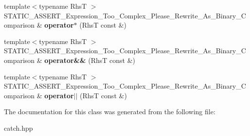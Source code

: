 \begin{DoxyCompactItemize}
\item 
\mbox{\label{classCatch_1_1ExpressionLhs_a9a94294c22449f62087862ef911e6291}} 
{\footnotesize template$<$typename RhsT $>$ }\\S\+T\+A\+T\+I\+C\+\_\+\+A\+S\+S\+E\+R\+T\+\_\+\+Expression\+\_\+\+Too\+\_\+\+Complex\+\_\+\+Please\+\_\+\+Rewrite\+\_\+\+As\+\_\+\+Binary\+\_\+\+Comparison \& {\bfseries operator$\ast$} (RhsT const \&)
\item 
\mbox{\label{classCatch_1_1ExpressionLhs_acbda1f937f8bd5b9da649626cc0b0f54}} 
{\footnotesize template$<$typename RhsT $>$ }\\S\+T\+A\+T\+I\+C\+\_\+\+A\+S\+S\+E\+R\+T\+\_\+\+Expression\+\_\+\+Too\+\_\+\+Complex\+\_\+\+Please\+\_\+\+Rewrite\+\_\+\+As\+\_\+\+Binary\+\_\+\+Comparison \& {\bfseries operator\&\&} (RhsT const \&)
\item 
\mbox{\label{classCatch_1_1ExpressionLhs_a6932b72da79d6c6b03d867772ceac61b}} 
{\footnotesize template$<$typename RhsT $>$ }\\S\+T\+A\+T\+I\+C\+\_\+\+A\+S\+S\+E\+R\+T\+\_\+\+Expression\+\_\+\+Too\+\_\+\+Complex\+\_\+\+Please\+\_\+\+Rewrite\+\_\+\+As\+\_\+\+Binary\+\_\+\+Comparison \& {\bfseries operator$\vert$$\vert$} (RhsT const \&)
\end{DoxyCompactItemize}


The documentation for this class was generated from the following file\+:\begin{DoxyCompactItemize}
\item 
catch.\+hpp\end{DoxyCompactItemize}
